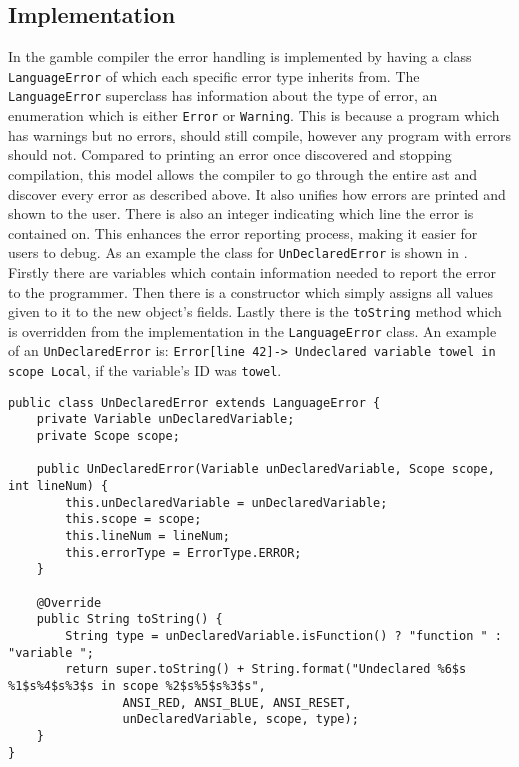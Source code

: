 \subsection*{Implementation}\label{subsec:ImplementationErrorHandling}
In the \gls{gamble} compiler the error handling is implemented by having a class \texttt{LanguageError} of which each specific error type inherits from.
The \texttt{LanguageError} superclass has information about the type of error, an enumeration which is either \texttt{Error} or \texttt{Warning}. 
This is because a program which has warnings but no errors, should still compile, however any program with errors should not. 
Compared to printing an error once discovered and stopping compilation, this model allows the compiler to go through the entire \acrshort{ast} and discover every error as described above. 
It also unifies how errors are printed and shown to the user.
There is also an integer indicating which line the error is contained on.
This enhances the error reporting process, making it easier for users to debug. 
As an example the class for \texttt{UnDeclaredError} is shown in .
Firstly there are variables which contain information needed to report the error to the programmer. 
Then there is a constructor which simply assigns all values given to it to the new object's fields.
Lastly there is the \texttt{toString} method which is overridden from the implementation in the \texttt{LanguageError} class. 
An example of an \texttt{UnDeclaredError} is: \texttt{Error[line   42]-> Undeclared variable towel in scope Local}, if the variable's ID was \texttt{towel}. %

\begin{lstlisting}[caption=The UnDeclaredError class in the \gls{gamble} compiler,numbers=none,frame=tlrb,label={lst:undeclarederrorclass}]
public class UnDeclaredError extends LanguageError {
    private Variable unDeclaredVariable;
    private Scope scope;

    public UnDeclaredError(Variable unDeclaredVariable, Scope scope, int lineNum) {
        this.unDeclaredVariable = unDeclaredVariable;
        this.scope = scope;
        this.lineNum = lineNum;
        this.errorType = ErrorType.ERROR;
    }

    @Override
    public String toString() {
        String type = unDeclaredVariable.isFunction() ? "function " : "variable ";
        return super.toString() + String.format("Undeclared %6$s %1$s%4$s%3$s in scope %2$s%5$s%3$s",
                ANSI_RED, ANSI_BLUE, ANSI_RESET,
                unDeclaredVariable, scope, type);
    }
}
\end{lstlisting}

